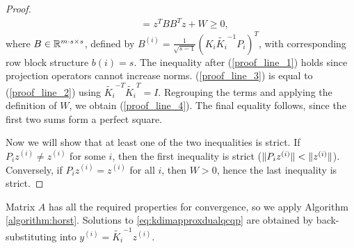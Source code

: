 \begin{proof}
\begin{align}
 &= z^T B B^T z + W \geq 0\nonumber,
\end{align}
where $B \in \mathbb{R}^{m\cdot s \times s}$, defined by $B^{(i)} = \frac{1}{\sqrt{s-1}}(K_i \widetilde{K_i}^{-1}P_i)^T$, with corresponding row block structure $b\left(i\right) = s$. The inequality after (\ref{proof_line_1}) holds since projection operators cannot increase norms.
(\ref{proof_line_3}) is equal to (\ref{proof_line_2}) using $\widetilde{K_i}^{-T}  \widetilde{K_i}^T = I$.
Regrouping the terms and applying the definition of $W$, we obtain (\ref{proof_line_4}).
The final equality follows, since the first two sums form a perfect square.

Now we will show that at least one of the two inequalities is strict. If $P_i z^{(i)} \neq z^{(i)}$ for some $i$, then the first inequality is strict ($\lVert P_i z^{(i)}\rVert < \lVert z^{(i)}\rVert$). Conversely, if $P_i z^{(i)} = z^{(i)}$ for all $i$, then $W > 0$, hence the last inequality is strict.%
\end{proof}



Matrix $A$ has all the required properties for convergence, so we
apply Algorithm \ref{algorithm:horst}. Solutions to
\eqref{eq:kdimapproxdualqcqp} are obtained by back-substituting into $y^{(i)} = \widetilde{K_i}^{-1} z^{(i)}$.


%
%
%
%
%

